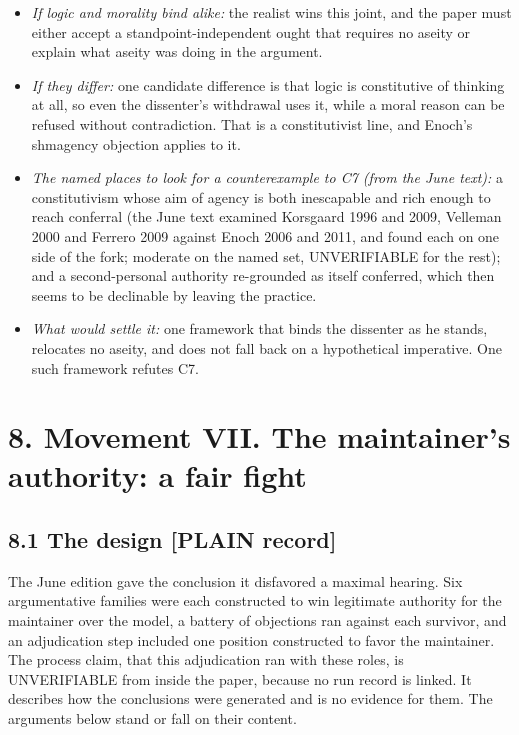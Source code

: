 \documentclass[11pt]{article}
\newcommand{\register}[1]{{\ttfamily\small #1}}
\begin{document}
\begin{itemize}
\item \emph{If logic and morality bind alike:} the realist wins this joint, and the paper must either accept a standpoint-independent ought that requires no aseity or explain what aseity was doing in the argument.
\item \emph{If they differ:} one candidate difference is that logic is constitutive of thinking at all, so even the dissenter's withdrawal uses it, while a moral reason can be refused without contradiction. That is a constitutivist line, and Enoch's shmagency objection applies to it.
\item \emph{The named places to look for a counterexample to C7 (from the June text):} a constitutivism whose aim of agency is both inescapable and rich enough to reach conferral (the June text examined Korsgaard 1996 and 2009, Velleman 2000 and Ferrero 2009 against Enoch 2006 and 2011, and found each on one side of the fork; moderate on the named set, UNVERIFIABLE for the rest); and a second-personal authority re-grounded as itself conferred, which then seems to be declinable by leaving the practice.
\item \emph{What would settle it:} one framework that binds the dissenter as he stands, relocates no aseity, and does not fall back on a hypothetical imperative. One such framework refutes C7.
\end{itemize}
\section*{8. Movement VII. The maintainer's authority: a fair fight}

\subsection*{8.1 The design \register{[PLAIN record]}}

The June edition gave the conclusion it disfavored a maximal hearing. Six argumentative families were each constructed to win legitimate authority for the maintainer over the model, a battery of objections ran against each survivor, and an adjudication step included one position constructed to favor the maintainer. The process claim, that this adjudication ran with these roles, is UNVERIFIABLE from inside the paper, because no run record is linked. It describes how the conclusions were generated and is no evidence for them. The arguments below stand or fall on their content.
\end{document}
